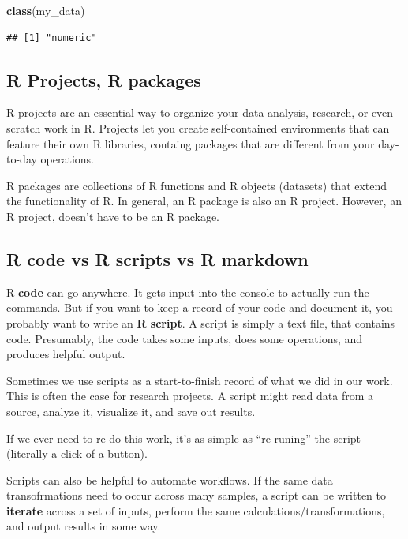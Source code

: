 \documentclass[
]{book}
\newenvironment{Shaded}{\begin{snugshade}}{\end{snugshade}}
\newcommand{\FunctionTok}[1]{\textcolor[rgb]{0.13,0.29,0.53}{\textbf{#1}}}
\newcommand{\NormalTok}[1]{#1}
\begin{document}
\begin{Shaded}
\begin{Highlighting}[]
\FunctionTok{class}\NormalTok{(my\_data)}
\end{Highlighting}
\end{Shaded}

\begin{verbatim}
## [1] "numeric"
\end{verbatim}

\hypertarget{r-projects-r-packages}{%
\subsection{R Projects, R packages}\label{r-projects-r-packages}}

R projects are an essential way to organize your data analysis, research, or even scratch work in R. Projects let you create self-contained environments that can feature their own R libraries, containg packages that are different from your day-to-day operations.

R packages are collections of R functions and R objects (datasets) that extend the functionality of R. In general, an R package is also an R project. However, an R project, doesn't have to be an R package.

\hypertarget{r-code-vs-r-scripts-vs-r-markdown}{%
\subsection{R code vs R scripts vs R markdown}\label{r-code-vs-r-scripts-vs-r-markdown}}

R \textbf{code} can go anywhere. It gets input into the console to actually run the commands. But if you want to keep a record of your code and document it, you probably want to write an \textbf{R script}. A script is simply a text file, that contains code. Presumably, the code takes some inputs, does some operations, and produces helpful output.

Sometimes we use scripts as a start-to-finish record of what we did in our work. This is often the case for research projects. A script might read data from a source, analyze it, visualize it, and save out results.

If we ever need to re-do this work, it's as simple as ``re-runing'' the script (literally a click of a button).

Scripts can also be helpful to automate workflows. If the same data transofrmations need to occur across many samples, a script can be written to \textbf{iterate} across a set of inputs, perform the same calculations/transformations, and output results in some way.
\end{document}
